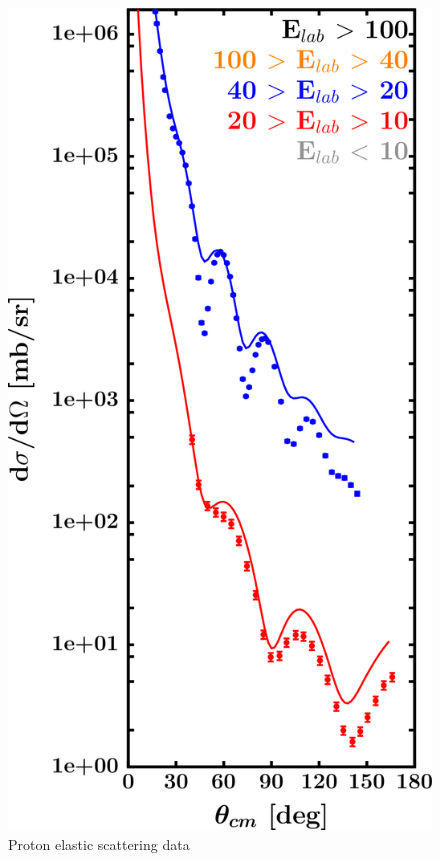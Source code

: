 \begin{figure}[H]
    \centering
    \begin{minipage}{0.45\textwidth}
        \centering
        \includegraphics[width=1.0\textwidth]{figures/sn112_protonElastic.png}
        \caption{Proton elastic scattering data}
        \label{DOMFitData_sn112_proton_elastic}

\end{minipage}
\end{figure}
